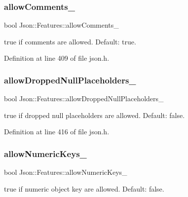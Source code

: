 \subsubsection{\texorpdfstring{allow\+Comments\+\_\+}{allowComments\_}}
{\footnotesize\ttfamily bool Json\+::\+Features\+::allow\+Comments\+\_\+}



{\ttfamily true} if comments are allowed. Default\+: {\ttfamily true}. 



Definition at line 409 of file json.\+h.

\hypertarget{class_json_1_1_features_a5076aa72c05c7596ac339ede36c97a6a}{}\label{class_json_1_1_features_a5076aa72c05c7596ac339ede36c97a6a} 
\subsubsection{\texorpdfstring{allow\+Dropped\+Null\+Placeholders\+\_\+}{allowDroppedNullPlaceholders\_}}
{\footnotesize\ttfamily bool Json\+::\+Features\+::allow\+Dropped\+Null\+Placeholders\+\_\+}



{\ttfamily true} if dropped null placeholders are allowed. Default\+: {\ttfamily false}. 



Definition at line 416 of file json.\+h.

\hypertarget{class_json_1_1_features_aff3cb16b79d15d3d761b11a0dd6d4d6b}{}\label{class_json_1_1_features_aff3cb16b79d15d3d761b11a0dd6d4d6b} 
\subsubsection{\texorpdfstring{allow\+Numeric\+Keys\+\_\+}{allowNumericKeys\_}}
{\footnotesize\ttfamily bool Json\+::\+Features\+::allow\+Numeric\+Keys\+\_\+}



{\ttfamily true} if numeric object key are allowed. Default\+: {\ttfamily false}. 



